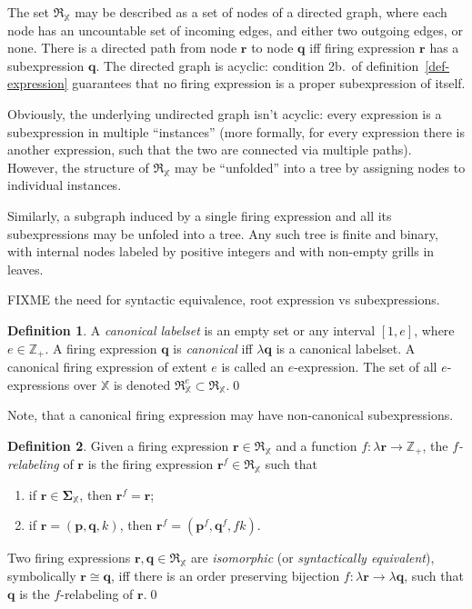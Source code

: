 \documentclass [a4paper,12pt] {article}
\theoremstyle{definition}
\newtheorem{definition}{Definition}[section]
\begin{document}
The set $\mathfrak{R}_{\mathbb X}$ may be described as a set of nodes
of a directed graph, where each node has an uncountable set of
incoming edges, and either two outgoing edges, or none.  There is a
directed path from node $\bm{r}$ to node $\bm{q}$ iff firing
expression $\bm{r}$ has a subexpression $\bm{q}$.  The directed graph
is acyclic: condition 2b.\ of definition~\ref{def-expression}
guarantees that no firing expression is a proper subexpression of
itself.

Obviously, the underlying undirected graph isn't acyclic: every
expression is a subexpression in multiple ``instances'' (more
formally, for every expression there is another expression, such that
the two are connected via multiple paths).  However, the structure of
$\mathfrak{R}_{\mathbb X}$ may be ``unfolded'' into a tree by
assigning nodes to individual instances.

Similarly, a subgraph induced by a single firing expression and all
its subexpressions may be unfoled into a tree.  Any such tree is
finite and binary, with internal nodes labeled by positive integers
and with non-empty grills in leaves.

FIXME the need for syntactic equivalence, root expression vs
subexpressions.

\begin {definition}\label{def-e-expression}
  A {\em canonical labelset}\/ is an empty set or any interval $[1,
    e]$, where $e \in {\mathbb Z}_+$.  A firing expression $\bm{q}$ is
  {\em canonical}\/ iff $\lambda\bm{q}$ is a canonical labelset.  A
  canonical firing expression of extent $e$ is called an
  $e$-expression.  The set of all $e$-expressions over ${\mathbb X}$
  is denoted $\mathfrak{R}_{\mathbb X}^e \subset \mathfrak{R}_{\mathbb
    X}$.\qed
\end {definition}

Note, that a canonical firing expression may have non-canonical
subexpressions.

\begin {definition}\label{def-relabeling}
  Given a firing expression $\bm{r} \in \mathfrak{R}_{\mathbb X}$ and
  a function $f\!: \lambda\bm{r} \rightarrow {\mathbb Z_+}$, the {\em
    $f$-relabeling}\/ of $\bm{r}$ is the firing expression $\bm{r}^f
  \in \mathfrak{R}_{\mathbb X}$ such that
  \begin {enumerate}
    \item if $\bm{r} \in \bm{\Sigma}_{\mathbb X}$, then $\bm{r}^f =
      \bm{r}$;
    \item if $\bm{r} = (\bm{p}, \bm{q}, k)$, then $\bm{r}^f =
      (\bm{p}^f, \bm{q}^f, fk)$.
  \end {enumerate}

  Two firing expressions $\bm{r}, \bm{q} \in \mathfrak{R}_{\mathbb X}$
  are {\em isomorphic}\/ (or {\em syntactically equivalent}\/),
  symbolically $\bm{r} \cong \bm{q}$, iff there is an order preserving
  bijection $f\!: \lambda\bm{r} \rightarrow \lambda\bm{q}$, such that
  $\bm{q}$ is the $f$-relabeling of $\bm{r}$.\qed
\end {definition}
\end{document}
